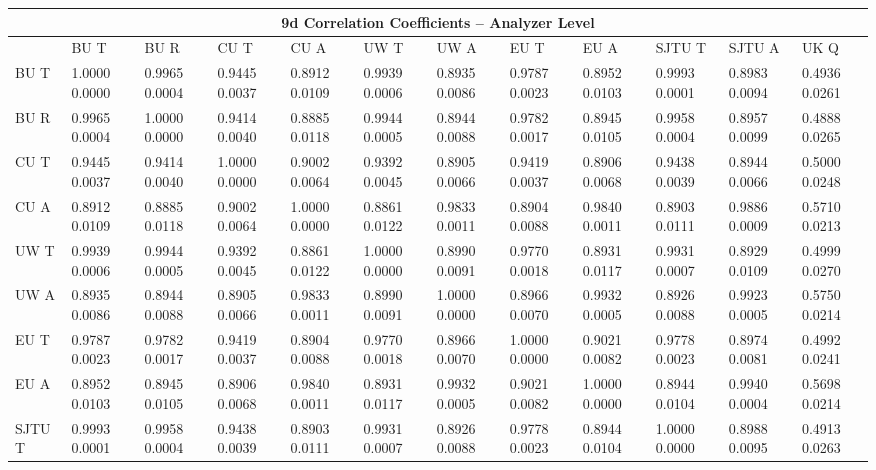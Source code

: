 \begin{landscape}
\begin{table}
\small
\centering
\renewcommand{\arraystretch}{1.5}
\begin{tabularx}{1\linewidth}{@{\extracolsep{\fill}}lXXXXXXXXXXX}
  \toprule
  	\multicolumn{12}{c}{{\normalsize 9d Correlation Coefficients -- Analyzer Level}} \\
  \midrule
  	       & BU T & BU R & CU T & CU A & UW T & UW A & EU T & EU A & SJTU T & SJTU A & UK Q \\
  \midrule
	BU T   & 1.0000 0.0000 & 0.9965 0.0004 & 0.9445 0.0037 & 0.8912 0.0109 & 0.9939 0.0006 & 0.8935 0.0086 & 0.9787 0.0023 & 0.8952 0.0103 & 0.9993 0.0001 & 0.8983 0.0094 & 0.4936 0.0261  \\
	BU R   & 0.9965 0.0004 & 1.0000 0.0000 & 0.9414 0.0040 & 0.8885 0.0118 & 0.9944 0.0005 & 0.8944 0.0088 & 0.9782 0.0017 & 0.8945 0.0105 & 0.9958 0.0004 & 0.8957 0.0099 & 0.4888 0.0265  \\
	CU T   & 0.9445 0.0037 & 0.9414 0.0040 & 1.0000 0.0000 & 0.9002 0.0064 & 0.9392 0.0045 & 0.8905 0.0066 & 0.9419 0.0037 & 0.8906 0.0068 & 0.9438 0.0039 & 0.8944 0.0066 & 0.5000 0.0248  \\
	CU A   & 0.8912 0.0109 & 0.8885 0.0118 & 0.9002 0.0064 & 1.0000 0.0000 & 0.8861 0.0122 & 0.9833 0.0011 & 0.8904 0.0088 & 0.9840 0.0011 & 0.8903 0.0111 & 0.9886 0.0009 & 0.5710 0.0213  \\
	UW T   & 0.9939 0.0006 & 0.9944 0.0005 & 0.9392 0.0045 & 0.8861 0.0122 & 1.0000 0.0000 & 0.8990 0.0091 & 0.9770 0.0018 & 0.8931 0.0117 & 0.9931 0.0007 & 0.8929 0.0109 & 0.4999 0.0270  \\
	UW A   & 0.8935 0.0086 & 0.8944 0.0088 & 0.8905 0.0066 & 0.9833 0.0011 & 0.8990 0.0091 & 1.0000 0.0000 & 0.8966 0.0070 & 0.9932 0.0005 & 0.8926 0.0088 & 0.9923 0.0005 & 0.5750 0.0214  \\
	EU T   & 0.9787 0.0023 & 0.9782 0.0017 & 0.9419 0.0037 & 0.8904 0.0088 & 0.9770 0.0018 & 0.8966 0.0070 & 1.0000 0.0000 & 0.9021 0.0082 & 0.9778 0.0023 & 0.8974 0.0081 & 0.4992 0.0241  \\
	EU A   & 0.8952 0.0103 & 0.8945 0.0105 & 0.8906 0.0068 & 0.9840 0.0011 & 0.8931 0.0117 & 0.9932 0.0005 & 0.9021 0.0082 & 1.0000 0.0000 & 0.8944 0.0104 & 0.9940 0.0004 & 0.5698 0.0214  \\
	SJTU T & 0.9993 0.0001 & 0.9958 0.0004 & 0.9438 0.0039 & 0.8903 0.0111 & 0.9931 0.0007 & 0.8926 0.0088 & 0.9778 0.0023 & 0.8944 0.0104 & 1.0000 0.0000 & 0.8988 0.0095 & 0.4913 0.0263  \\

\end{tabularx}
\end{table}
\end{landscape}
